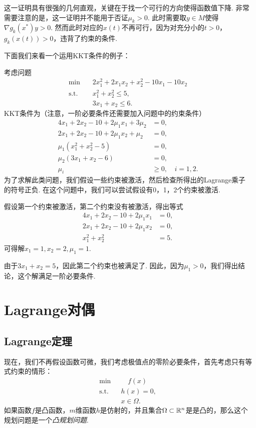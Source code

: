 \begin{remark}
这一证明具有很强的几何直观，关键在于找一个可行的方向使得函数值下降. 非常需要注意的是，这一证明并不能用于否证$\mu_k>0$. 此时需要取${y}\in M$使得$\nabla g_k({x^\ast})y>0$. 然而此时对应的$x(t)$不再可行，因为对充分小的$t>0$，$g_k(x(t))>0$，违背了约束的条件.
\end{remark}

下面我们来看一个运用KKT条件的例子：
\begin{example}
考虑问题
\begin{align*}
    \min \quad &2x_1^2+2x_1x_2+x_2^2-10x_1-10x_2 \\
    \text{s.t.}\quad &x_1^2+x_2^2\le 5, \\
    & 3x_1+x_2\le 6.
\end{align*}
KKT条件为（注意，一阶必要条件还需要加入问题中的约束条件）
\begin{align*}
    4x_1+2x_2-10+2\mu_1x_1+3\mu_2&=0, \\
    2x_1+2x_2-10+2\mu_1x_2+\mu_2&=0, \\
    \mu_1(x_1^2+x_2^2-5)&=0, \\
    \mu_2(3x_1+x_2-6)&=0,\\
    \mu_i&\ge 0,\quad i=1,2.
\end{align*}
为了求解此类问题，我们假设一些约束被激活，然后检查所得出的Lagrange乘子的符号正负. 在这个问题中，我们可以尝试假设有0，1，2个约束被激活. 

假设第一个约束被激活，第二个约束没有被激活，得出等式
\begin{align*}
4x_1+2x_2-10+2\mu_1x_1&=0, \\
2x_1+2x_2-10+2\mu_1x_2&=0, \\
x_1^2+x_2^2&=5.
\end{align*}
可得解$x_1=1,x_2=2,\mu_1=1.$

由于$3x_1+x_2=5$，因此第二个约束也被满足了. 因此，因为$\mu_1 > 0$，我们得出结论，这个解满足一阶必要条件. 
\end{example}

\section{Lagrange对偶}
\subsection{Lagrange定理}
现在，我们不再假设函数可微，我们考虑极值点的零阶必要条件，首先考虑只有等式约束的情形：
    \begin{equation}
          \begin{aligned}
        \min&\quad f({x}) \\
        \text{s.t.}\quad& {h(x)=0}, \\
        &{x}\in\Omega.
        \end{aligned}\label{eq:eq-zero-cond}
    \end{equation}
如果函数$f$是凸函数，$m$维函数${h}$是仿射的，并且集合$\Omega\subset \mathbb{R}^n$是是凸的，那么这个规划问题是一个\emph{凸规划问题}. 

